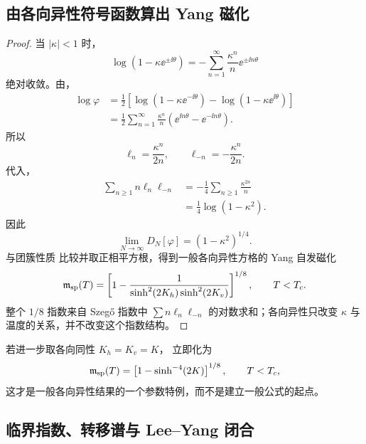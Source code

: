 \subsection{由各向异性符号函数算出 Yang 磁化}

\begin{proof}
当 \(|\kappa|<1\) 时，
\[
 \log(1-\kappa\ee^{\pm\ii\theta})
 =-\sum_{n=1}^{\infty}
 \frac{\kappa^n}{n}\ee^{\pm\ii n\theta}
\]
绝对收敛。由，
\[
 \begin{aligned}
 \log\varphi
 &=\frac12\left[
 \log(1-\kappa\ee^{-\ii\theta})
 -\log(1-\kappa\ee^{\ii\theta})
 \right]\\
 &=\frac12\sum_{n=1}^{\infty}
 \frac{\kappa^n}{n}
 \left(\ee^{\ii n\theta}-\ee^{-\ii n\theta}\right).
 \end{aligned}
\]
所以
\[
 \ell_n=\frac{\kappa^n}{2n},
 \qquad
 \ell_{-n}=-\frac{\kappa^n}{2n}.
\]
代入，
\[
 \begin{aligned}
 \sum_{n\ge1}n\ell_n\ell_{-n}
 &=-\frac14\sum_{n\ge1}\frac{\kappa^{2n}}{n}\\
 &=\frac14\log(1-\kappa^2).
 \end{aligned}
\]
因此
\[
 \lim_{N\to\infty}D_N[\varphi]
 =(1-\kappa^2)^{1/4}.
\]
与团簇性质 比较并取正相平方根，得到一般各向异性方格的 Yang 自发磁化
\begin{equation}
 \mathfrak m_{\rm sp}(T)
 =\left[
 1-\frac{1}{\sinh^2(2K_h)\sinh^2(2K_v)}
 \right]^{1/8},
 \qquad T<T_c.
 \label{eq:phys-sm-yang-mag-anisotropic}
\end{equation}
整个 \(1/8\) 指数来自 Szeg\H{o} 指数中
\(
\sum n\ell_n\ell_{-n}
\)
的对数求和；各向异性只改变 \(\kappa\) 与温度的关系，并不改变这个指数结构。
\end{proof}

若进一步取各向同性 \(K_h=K_v=K\)， 立即化为
\begin{equation}
 \mathfrak m_{\rm sp}(T)
 =\left[1-\sinh^{-4}(2K)\right]^{1/8},
 \qquad T<T_c,
 \label{eq:phys-sm-yang-mag}
\end{equation}
这才是一般各向异性结果的一个参数特例，而不是建立一般公式的起点。

\subsection{临界指数、转移谱与 Lee--Yang 闭合}

